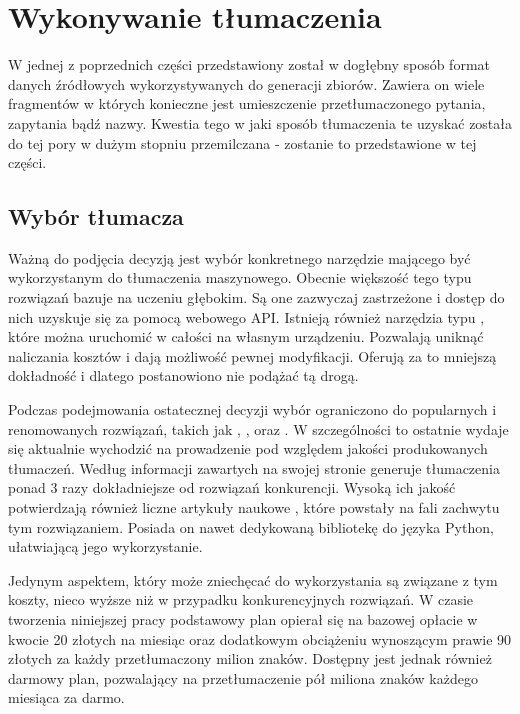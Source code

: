 \section{Wykonywanie tłumaczenia}
W jednej z poprzednich części przedstawiony został w dogłębny sposób format danych źródłowych wykorzystywanych do generacji zbiorów. Zawiera on wiele fragmentów w których konieczne jest umieszczenie przetłumaczonego pytania, zapytania bądź nazwy. Kwestia tego w jaki sposób tłumaczenia te uzyskać została do tej pory w dużym stopniu przemilczana - zostanie to przedstawione w tej części.

\subsection{Wybór tłumacza}
Ważną do podjęcia decyzją jest wybór konkretnego narzędzie mającego być wykorzystanym do tłumaczenia maszynowego. Obecnie większość tego typu rozwiązań bazuje na uczeniu głębokim. Są one zazwyczaj zastrzeżone i dostęp do nich uzyskuje się za pomocą webowego API. Istnieją również narzędzia typu , które można uruchomić w całości na własnym urządzeniu. Pozwalają uniknąć naliczania kosztów i dają możliwość pewnej modyfikacji. Oferują za to mniejszą dokładność i dlatego postanowiono nie podążać tą drogą.

Podczas podejmowania ostatecznej decyzji wybór ograniczono do popularnych i renomowanych rozwiązań, takich jak  ,  ,   oraz  . W szczególności to ostatnie wydaje się aktualnie wychodzić na prowadzenie pod względem jakości produkowanych tłumaczeń. Według informacji zawartych na swojej stronie  generuje tłumaczenia ponad 3 razy dokładniejsze od rozwiązań konkurencji. Wysoką ich jakość potwierdzają również liczne artykuły naukowe , które powstały na fali zachwytu tym rozwiązaniem. Posiada on nawet dedykowaną bibliotekę do języka Python, ułatwiającą jego wykorzystanie. 

Jedynym aspektem, który może zniechęcać do wykorzystania  są związane z tym koszty, nieco wyższe niż w przypadku konkurencyjnych rozwiązań. W czasie tworzenia niniejszej pracy podstawowy plan opierał się na bazowej opłacie w kwocie 20 złotych na miesiąc oraz dodatkowym obciążeniu wynoszącym prawie 90 złotych za każdy przetłumaczony milion znaków. Dostępny jest jednak również darmowy plan, pozwalający na przetłumaczenie pół miliona znaków każdego miesiąca za darmo.

